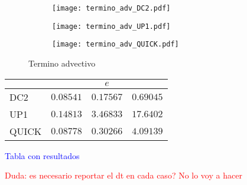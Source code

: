 \documentclass[aps,prb,twocolumn,superscriptaddress,floatfix,longbibliography,10pt]{revtex4-2}
\begin{document}
\begin{figure}
  \centering
  \begin{subfigure}[b]{0.32\textwidth}
      \centering
      \texttt{[image: termino\_adv\_DC2.pdf]}
      \caption{}
      \label{fig:termino_adv_DC2}
  \end{subfigure}
  \hfill
  \begin{subfigure}[b]{0.32\textwidth}
      \centering
      \texttt{[image: termino\_adv\_UP1.pdf]}
      \caption{}
      \label{fig:termino_adv_UP1}
  \end{subfigure}
  \hfill
  \begin{subfigure}[b]{0.32\textwidth}
      \centering
      \texttt{[image: termino\_adv\_QUICK.pdf]}
      \caption{}
      \label{fig:termino_adv_QUICK}
  \end{subfigure}
     \caption{Termino advectivo}
     \label{fig:termino_advectivo}
\end{figure}



\twocolumngrid




\begin{table}[]
  \begin{tabular}{l|ccc|}
  \cline{2-4}
                            & \multicolumn{3}{c|}{$e$}                                                    \\ \hline
  \multicolumn{1}{|l|}{DC2} & \multicolumn{1}{c|}{$0.08541$} & \multicolumn{1}{c|}{$0.17567$} & $0.69045$ \\ \hline
  \multicolumn{1}{|l|}{UP1} & \multicolumn{1}{c|}{$0.14813$} & \multicolumn{1}{c|}{$3.46833$} & $17.6402$ \\ \hline
  \multicolumn{1}{|l|}{QUICK} & \multicolumn{1}{c|}{$0.08778$} & \multicolumn{1}{c|}{$0.30266$} & $4.09139$ \\ \hline
  \end{tabular}
  \end{table}

\textcolor{blue}{Tabla con resultados}



\textcolor{red}{Duda: es necesario reportar el dt en cada caso? No lo voy a hacer}
\end{document}
